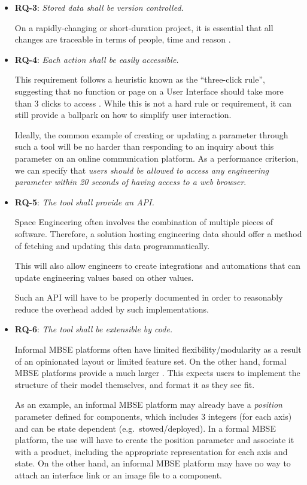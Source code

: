 \documentclass[]{iac}
\def\todo#1{}
\begin{document}
\begin{itemize}[itemsep=6pt]
    \item \textbf{RQ-3}: \emph{Stored data shall be version controlled.}

    On a rapidly-changing or short-duration project, it is essential that all changes are traceable in terms of people, time and reason \todo{}. 

    \item \textbf{RQ-4}: \emph{Each action shall be easily accessible.}

    This requirement follows a heuristic known as the ``three-click rule'', suggesting that no function or page on a User Interface should take more than 3 clicks to access \autocite{glassey_proximity_2005}. While this is not a hard rule or requirement\todo{}, it can still provide a ballpark on how to simplify user interaction.

    Ideally, the common example of creating or updating a parameter through such a tool will be no harder than responding to an inquiry about this parameter on an online communication platform. As a performance criterion, we can specify that \emph{users should be allowed to access any engineering parameter within 20 seconds of having access to a web browser}.

    \item \textbf{RQ-5}: \emph{The tool shall provide an \acf{API}.}

    Space Engineering often involves the combination of multiple pieces of software. Therefore, a solution hosting engineering data should offer a method of fetching and updating this data programmatically.

    This will also allow engineers to create integrations and automations that can update engineering values based on other values. \todo{}

    Such an \acs{API} will have to be properly documented in order to reasonably reduce the overhead added by such implementations.

    \item \textbf{RQ-6}: \emph{The tool shall be extensible by code.}

    Informal \acs{MBSE} platforms often have limited flexibility/modularity as a result of \todo{having} an opinionated layout or limited feature set. On the other hand, formal \acs{MBSE} platforms provide a much larger \todo{margin of creativity/blanker slate}.  This expects users to implement the structure of their model themselves, and format it as they see fit.

    As an example, an informal \acs{MBSE} platform may already have a \emph{position} parameter defined for components, which includes 3 integers (for each axis) and can be state dependent (e.g.~stowed/deployed). In a formal \acs{MBSE} platform, the use will have to create the position parameter and associate it with a product, including the appropriate representation for each axis and state. On the other hand, an informal \acs{MBSE} platform may have no way to attach an interface link or an image file to a component.


\end{itemize}
\end{document}
